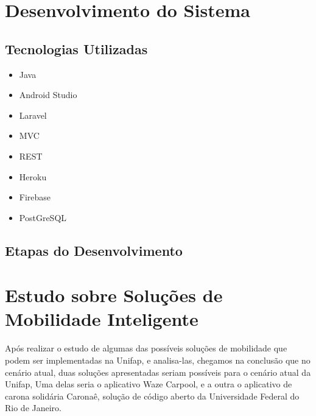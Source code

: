 \section{Desenvolvimento do Sistema}
\subsection{Tecnologias Utilizadas}

\begin{itemize}
	\item Java
	\item Android Studio
	\item Laravel
	\item MVC
	\item REST
	\item Heroku
	\item Firebase
	\item PostGreSQL
\end{itemize}

\subsection{Etapas do Desenvolvimento}

\section{Estudo sobre Soluções de Mobilidade Inteligente}


 %

Após realizar o estudo de algumas das possíveis soluções de mobilidade que podem ser implementadas na Unifap, e analisa-las, chegamos na conclusão que no cenário atual, duas soluções apresentadas seriam possíveis para o cenário atual da Unifap, Uma delas seria o aplicativo Waze Carpool, e a outra o aplicativo de carona solidária Caronaê, solução de código aberto da Universidade Federal do Rio de Janeiro.

